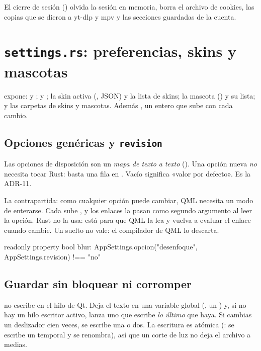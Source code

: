El cierre de sesión () olvida la sesión en memoria, borra el archivo de cookies,
las copias que se dieron a yt-dlp y mpv y las secciones guardadas de la cuenta.

\section{\texttt{settings.rs}: preferencias, skins y mascotas}

 expone:  y ;  y
; la skin activa (, JSON) y la lista de skins; la mascota
() y su lista; y las carpetas de skins y mascotas. Además , un
entero que sube con cada cambio.

\subsection{Opciones genéricas y \texttt{revision}}

Las opciones de disposición son un \emph{mapa de texto a texto}
(). Una opción nueva \emph{no} necesita tocar Rust: basta una
fila en . Vacío significa «valor por defecto». Es la ADR-11.

La contrapartida: como cualquier opción puede cambiar, QML necesita un modo de enterarse. Cada
 sube , y los enlaces la pasan como segundo argumento al leer la
opción. Rust no la usa: está para que QML la lea y vuelva a evaluar el enlace cuando cambie.
Un  suelto no vale: el compilador de QML lo descarta.

\begin{qml}
readonly property bool blur: AppSettings.opcion("desenfoque", AppSettings.revision) !== "no"
\end{qml}

\subsection{Guardar sin bloquear ni corromper}

 no escribe en el hilo de Qt. Deja el texto en una variable global
(, un ) y, si no hay un hilo escritor activo, lanza uno que escribe
\emph{lo último} que haya. Si cambias un deslizador cien veces, se escribe una o dos. La
escritura es atómica (: se escribe un temporal y se renombra), así que un
corte de luz no deja el archivo a medias.

